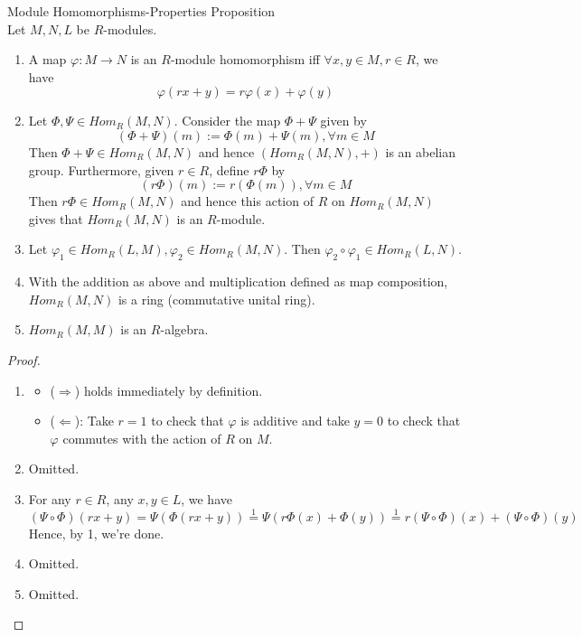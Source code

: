 \begin{proposition}{Module Homomorphisms-Properties Proposition}\\
Let $M,N,L$ be $R$-modules.
\begin{enumerate}
    \item A map $\varphi: M \to N$ is an $R$-module homomorphism iff $\forall x,y \in M, r\in R$, we have
    $$\varphi (rx+y) = r\varphi (x)+\varphi(y)$$

    \item Let $\Phi,\Psi \in Hom_R(M,N)$. Consider the map $\Phi+\Psi$ given by
    $$(\Phi+ \Psi)(m) := \Phi(m) + \Psi(m), \forall m \in M$$
    Then $\Phi+\Psi \in Hom_R(M,N)$ and hence $(Hom_R(M,N),+)$ is an abelian group. Furthermore, given $r\in R$, define $r\Phi$ by
    $$(r\Phi)(m) := r(\Phi(m)), \forall m\in M$$
    Then $r\Phi \in Hom_R(M,N)$ and hence this action of $R$ on $Hom_R(M,N)$ gives that $Hom_R(M,N)$ is an $R$-module.

    \item Let $\varphi_1 \in Hom_R(L,M),\varphi_2 \in Hom_R(M,N)$. Then $\varphi_2 \circ \varphi_1 \in Hom_R(L,N)$.

    \item With the addition as above and multiplication defined as map composition, $Hom_R(M,N)$ is a ring (commutative unital ring).
    \item $Hom_R(M,M)$ is an $R$-algebra.
\end{enumerate}
\end{proposition}

\begin{proof}
    \begin{enumerate}
        \item \begin{itemize}
            \item ($\Rightarrow$) holds immediately by definition.
            \item ($\Leftarrow$): Take $r=1$ to check that $\varphi$ is additive and take $y=0$ to check that $\varphi$ commutes with the action of $R$ on $M$.
        \end{itemize}

        \item Omitted.
        \item For any $r\in R$, any $x,y\in L$, we have
        $$(\Psi \circ \Phi) (rx+y) = \Psi (\Phi(rx+y)) \overset{1}{=} \Psi (r \Phi(x) + \Phi(y)) \overset{1}{=} r(\Psi\circ \Phi) (x)+ (\Psi\circ \Phi) (y)$$
        Hence, by 1, we're done.

        \item Omitted.
        \item Omitted.
    \end{enumerate}
\end{proof}


